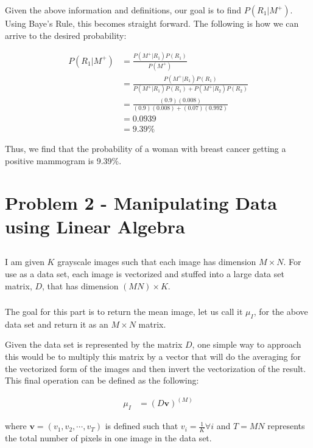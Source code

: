 \documentclass{article}[12pt]
\begin{document}
   Given the above information and definitions, our goal is to find $P(R_1 | M^{+})$. Using Baye's Rule, this becomes straight forward. The following is how we can arrive to the desired probability:
   
   \begin{align*}
   P(R_1 | M^{+}) &= \frac{P(M^{+} | R_1) P(R_1) }{P(M^{+})} \\
   &= \frac{P(M^{+} | R_1) P(R_1) }{P(M^{+} | R_1) P(R_1) + P(M^{+} | R_2) P(R_2)} \\
   &= \frac{(0.9) (0.008) }{(0.9) (0.008) + (0.07) (0.992)} \\
   &= 0.0939 \\
   &= 9.39\%
   \end{align*}
   
   Thus, we find that the probability of a woman with breast cancer getting a positive mammogram is 9.39\%.

	\newpage
	\section{Problem 2 - Manipulating Data using Linear Algebra}
	\subsection{}
	I am given $K$ grayscale images such that each image has dimension $M \times N$. For use as a data set, each image is vectorized and stuffed into a large data set matrix, $D$, that has dimension $(MN) \times K$.
	
	\subsubsection{}
	The goal for this part is to return the mean image, let us call it $\mu_I$, for the above data set and return it as an $M \times N$ matrix. 
	
	Given the data set is represented by the matrix $D$, one simple way to approach this would be to multiply this matrix by a vector that will do the averaging for the vectorized form of the images and then invert the vectorization of the result. This final operation can be defined as the following:
	
	\begin{align*}
	\mu_I &= (D \boldsymbol{v} )^{(M)}
	\end{align*}
	
	where $\boldsymbol{v} = (v_1, v_2, \cdots, v_{T})$ is defined such that $v_i = \frac{1}{K} \forall i$ and $T = MN$ represents the total number of pixels in one image in the data set.
	
\end{document}
